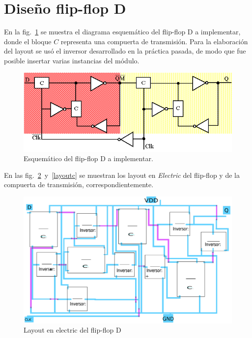\documentclass[twocolumn]{IEEEtran}
\begin{document}
\section{Diseño flip-flop D}
\noindent
En la fig.~\ref{ffd} se muestra el diagrama esquemático del flip-flop D a implementar, donde el bloque $C$ representa una compuerta de transmisión. Para la elaboración del layout se usó el inversor desarrollado en la práctica pasada, de modo que fue posible insertar varias instancias del módulo.
\begin{figure}[H]
  \centering
    \includegraphics[scale=0.35]{./pics/ffd.png}
      \caption{Esquemático del flip-flop D a implementar.\cite{ff}}
	\label{ffd}
\end{figure}
\noindent
En las fig.~\ref{layoutff}~y~\ref{layoutc} se muestran los layout en \textit{Electric} del flip-flop y de la compuerta de transmisión, correspondientemente.
\begin{figure}[H]
  \centering
    \includegraphics[scale=0.12]{./pics/layoutff2.png}
      \caption{Layout en electric del flip-flop D}
	\label{layoutff}
\end{figure}
\end{document}
